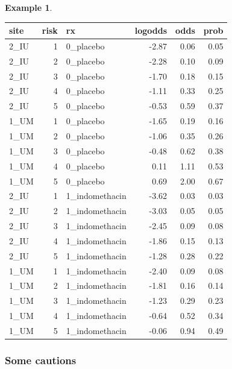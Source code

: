 \documentclass[
  openany]{book}
\theoremstyle{definition}
\theoremstyle{definition}
\newtheorem{example}{Example}[chapter]
\theoremstyle{definition}
\theoremstyle{definition}
\theoremstyle{remark}
\begin{document}
\begin{example}
\begin{tabular}{l|r|l|r|r|r}
\hline
site & risk & rx & logodds & odds & prob\\
\hline
2\_IU & 1 & 0\_placebo & -2.87 & 0.06 & 0.05\\
\hline
2\_IU & 2 & 0\_placebo & -2.28 & 0.10 & 0.09\\
\hline
2\_IU & 3 & 0\_placebo & -1.70 & 0.18 & 0.15\\
\hline
2\_IU & 4 & 0\_placebo & -1.11 & 0.33 & 0.25\\
\hline
2\_IU & 5 & 0\_placebo & -0.53 & 0.59 & 0.37\\
\hline
1\_UM & 1 & 0\_placebo & -1.65 & 0.19 & 0.16\\
\hline
1\_UM & 2 & 0\_placebo & -1.06 & 0.35 & 0.26\\
\hline
1\_UM & 3 & 0\_placebo & -0.48 & 0.62 & 0.38\\
\hline
1\_UM & 4 & 0\_placebo & 0.11 & 1.11 & 0.53\\
\hline
1\_UM & 5 & 0\_placebo & 0.69 & 2.00 & 0.67\\
\hline
2\_IU & 1 & 1\_indomethacin & -3.62 & 0.03 & 0.03\\
\hline
2\_IU & 2 & 1\_indomethacin & -3.03 & 0.05 & 0.05\\
\hline
2\_IU & 3 & 1\_indomethacin & -2.45 & 0.09 & 0.08\\
\hline
2\_IU & 4 & 1\_indomethacin & -1.86 & 0.15 & 0.13\\
\hline
2\_IU & 5 & 1\_indomethacin & -1.28 & 0.28 & 0.22\\
\hline
1\_UM & 1 & 1\_indomethacin & -2.40 & 0.09 & 0.08\\
\hline
1\_UM & 2 & 1\_indomethacin & -1.81 & 0.16 & 0.14\\
\hline
1\_UM & 3 & 1\_indomethacin & -1.23 & 0.29 & 0.23\\
\hline
1\_UM & 4 & 1\_indomethacin & -0.64 & 0.52 & 0.34\\
\hline
1\_UM & 5 & 1\_indomethacin & -0.06 & 0.94 & 0.49\\
\hline
\end{tabular}

\end{example}

\hypertarget{some-cautions}{%
\subsubsection*{Some cautions}\label{some-cautions}}
\end{document}
